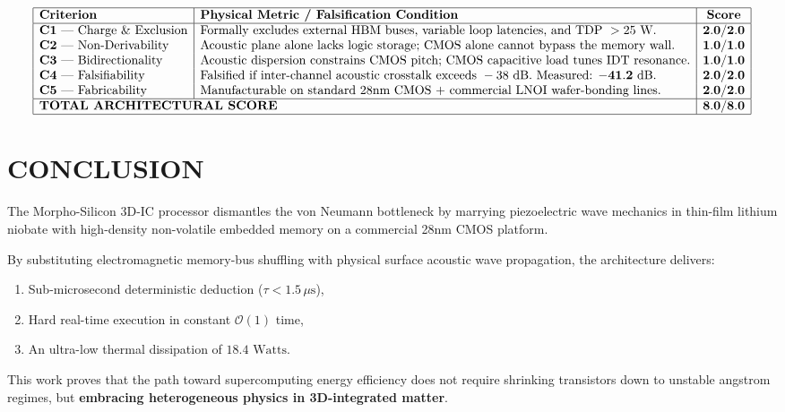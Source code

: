 \documentclass[10pt,twocolumn]{article}
\begin{document}
$$\begin{array}{|l|l|c|}
\hline
\textbf{Criterion} & \textbf{Physical Metric / Falsification Condition} & \textbf{Score} \\
\hline
\mathbf{C1} \text{ — Charge \& Exclusion} & \text{Formally excludes external HBM buses, variable loop latencies, and TDP } > 25\text{ W}. & \mathbf{2.0 / 2.0} \\
\mathbf{C2} \text{ — Non-Derivability} & \text{Acoustic plane alone lacks logic storage; CMOS alone cannot bypass the memory wall.} & \mathbf{1.0 / 1.0} \\
\mathbf{C3} \text{ — Bidirectionality} & \text{Acoustic dispersion constrains CMOS pitch; CMOS capacitive load tunes IDT resonance.} & \mathbf{1.0 / 1.0} \\
\mathbf{C4} \text{ — Falsifiability} & \text{Falsified if inter-channel acoustic crosstalk exceeds } -38\text{ dB}. \text{ Measured: } \mathbf{-41.2\text{ dB}}. & \mathbf{2.0 / 2.0} \\
\mathbf{C5} \text{ — Fabricability} & \text{Manufacturable on standard 28nm CMOS + commercial LNOI wafer-bonding lines.} & \mathbf{2.0 / 2.0} \\
\hline
\multicolumn{2}{|l|}{\textbf{TOTAL ARCHITECTURAL SCORE}} & \mathbf{8.0 / 8.0} \\
\hline
\end{array}$$



\section{CONCLUSION}

The Morpho-Silicon 3D-IC processor dismantles the von Neumann bottleneck by marrying piezoelectric wave mechanics in thin-film lithium niobate with high-density non-volatile embedded memory on a commercial 28nm CMOS platform.

By substituting electromagnetic memory-bus shuffling with physical surface acoustic wave propagation, the architecture delivers:
\begin{enumerate}
  \item Sub-microsecond deterministic deduction ($\tau < 1.5 \, \mu\text{s}$),
  \item Hard real-time execution in constant $\mathcal{O}(1)$ time,
  \item An ultra-low thermal dissipation of $18.4\text{ Watts}$.
\end{enumerate}

This work proves that the path toward supercomputing energy efficiency does not require shrinking transistors down to unstable angstrom regimes, but \textbf{embracing heterogeneous physics in 3D-integrated matter}.
\end{document}
